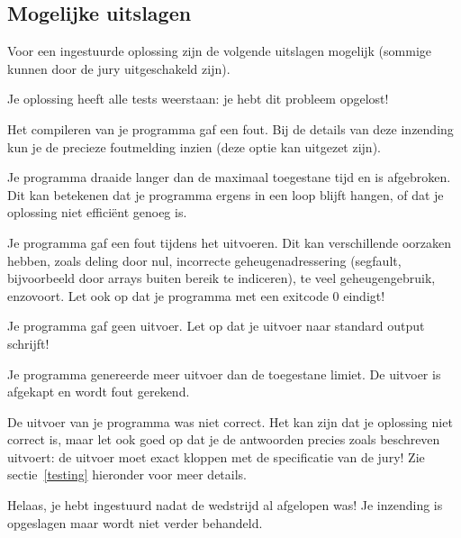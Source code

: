 \subsection{Mogelijke uitslagen}

Voor een ingestuurde oplossing zijn de volgende uitslagen mogelijk
(sommige kunnen door de jury uitgeschakeld zijn).

\begin{description}[\setleftmargin{4.5cm}]
\item[CORRECT]
Je oplossing heeft alle tests weerstaan: je hebt dit probleem opgelost!

\item[COMPILER-ERROR]
Het compileren van je programma gaf een fout. Bij de details
van deze inzending kun je de precieze foutmelding inzien
(deze optie kan uitgezet zijn).

\item[TIMELIMIT]
Je programma draaide langer dan de maximaal toegestane tijd en is
afgebroken. Dit kan betekenen dat je programma ergens in een loop
blijft hangen, of dat je oplossing niet effici\"ent genoeg is.

\item[RUN-ERROR]
Je programma gaf een fout tijdens het uitvoeren. Dit kan verschillende
oorzaken hebben, zoals deling door nul, incorrecte geheugen\-adressering
(segfault, bijvoorbeeld door arrays buiten bereik te indiceren), te
veel geheugengebruik, enzovoort.
Let ook op dat je programma met een exitcode 0 eindigt!

\item[NO-OUTPUT]
Je programma gaf geen uitvoer. Let op dat je uitvoer naar standard
output schrijft!

\item[OUTPUT-LIMIT]
Je programma genereerde meer uitvoer dan de toegestane limiet. De
uitvoer is afgekapt en wordt fout gerekend.

\item[WRONG-ANSWER]
De uitvoer van je programma was niet correct. Het kan zijn dat je
oplossing niet correct is, maar let ook goed op dat je de antwoorden
precies zoals beschreven uitvoert: de uitvoer moet exact kloppen met
de specificatie van de jury! Zie sectie~\ref{testing} hieronder voor
meer details.

\item[TOO-LATE]
Helaas, je hebt ingestuurd nadat de wedstrijd al afgelopen was!
Je inzending is opgeslagen maar wordt niet verder behandeld.
\end{description}

